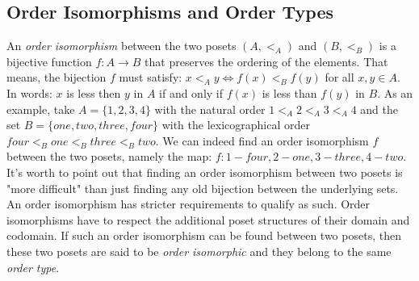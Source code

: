 






\subsection{Order Isomorphisms and Order Types}
An \emph{order isomorphism} between the two posets $(A, <_A)$ and $(B, <_B)$ is a bijective function $f: A \rightarrow B$ that preserves the ordering of the elements. That means, the bijection $f$ must satisfy: $x <_A y \Leftrightarrow f(x) <_B f(y)$ for all $x,y \in A$. In words: $x$ is less then $y$ in $A$ if and only if $f(x)$ is less than $f(y)$ in $B$. As an example, take $A=\{1,2,3,4\}$ with the natural order $1 <_A 2 <_A 3 <_A 4$ and the set $B=\{one,two,three,four\}$ with the lexicographical order $four <_B one <_B three <_B two$. We can indeed find an order isomorphism $f$ between the two posets, namely the map: $f: 1-four, 2-one, 3-three, 4-two$. It's worth to point out that finding an order isomorphism between two posets is "more difficult" than just finding any old bijection between the underlying sets. An order isomorphism has stricter requirements to qualify as such. Order isomorphisms have to respect the additional poset structures of their domain and codomain. If such an order isomorphism can be found between two posets, then these two posets are said to be \emph{order isomorphic} and they belong to the same \emph{order type}.


